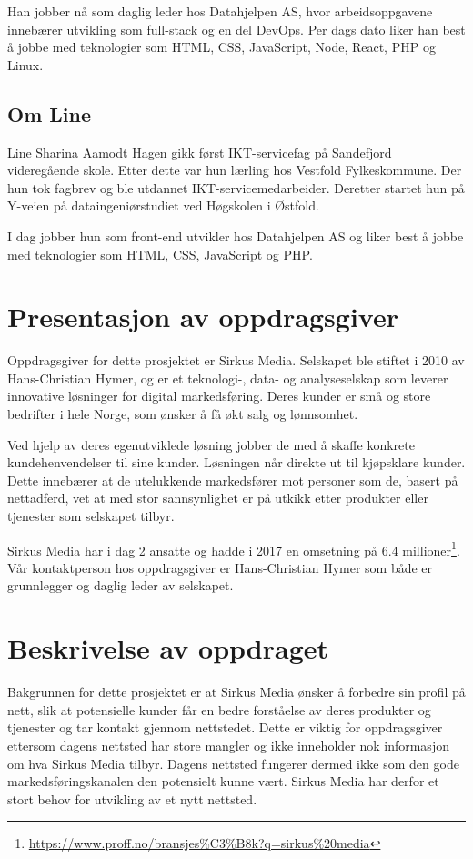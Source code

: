 Han jobber nå som daglig leder hos Datahjelpen AS, hvor arbeidsoppgavene innebærer utvikling som full-stack og en del DevOps. Per dags dato liker han best å jobbe med teknologier som HTML, CSS, JavaScript, Node, React, PHP og Linux.

\subsection{Om Line}
Line Sharina Aamodt Hagen gikk først IKT-servicefag på Sandefjord videregående skole. Etter dette var hun lærling hos Vestfold Fylkeskommune. Der hun tok fagbrev og ble utdannet IKT-servicemedarbeider. Deretter startet hun på Y-veien på dataingeniørstudiet ved Høgskolen i Østfold.

I dag jobber hun som front-end utvikler hos Datahjelpen AS og liker best å jobbe med teknologier som HTML, CSS, JavaScript og PHP.

\section{Presentasjon av oppdragsgiver}
Oppdragsgiver for dette prosjektet er Sirkus Media.
Selskapet ble stiftet i 2010 av Hans-Christian Hymer, og er et teknologi-, data- og analyseselskap som leverer innovative løsninger for digital markedsføring. Deres kunder er små og store bedrifter i hele Norge, som ønsker å få økt salg og lønnsomhet. 

Ved hjelp av deres egenutviklede løsning jobber de med å skaffe konkrete kundehenvendelser til sine kunder. Løsningen når direkte ut til kjøpsklare kunder. Dette innebærer at de utelukkende markedsfører mot personer som de, basert på nettadferd, vet at med stor sannsynlighet er på utkikk etter produkter eller tjenester som selskapet tilbyr.

Sirkus Media har i dag 2 ansatte og hadde i 2017 en omsetning på 6.4 millioner\footnote{\url{https://www.proff.no/bransjes\%C3\%B8k?q=sirkus\%20media}}.
Vår kontaktperson hos oppdragsgiver er Hans-Christian Hymer som både er grunnlegger og daglig leder av selskapet. 

\section{Beskrivelse av oppdraget}
\label{sec:oppgaven}
Bakgrunnen for dette prosjektet er at Sirkus Media ønsker å forbedre sin profil på nett, slik at potensielle kunder får en bedre forståelse av deres produkter og tjenester og tar kontakt gjennom nettstedet. Dette er viktig for oppdragsgiver ettersom dagens nettsted har store mangler og ikke inneholder nok informasjon om hva Sirkus Media tilbyr. Dagens nettsted fungerer dermed ikke som den gode markedsføringskanalen den potensielt kunne vært. Sirkus Media har derfor et stort behov for utvikling av et nytt nettsted.

